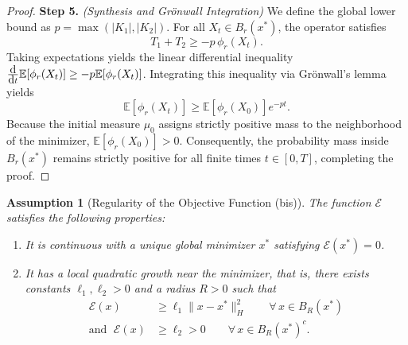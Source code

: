 \documentclass[12pt]{amsart}
\newcommand{\D}[1]{\mbox{\rm #1}}
\newcommand{\dd}{\D{d}}
\numberwithin{equation}{section}
\newtheorem{assumption}[theorem]{Assumption}
\begin{document}
\begin{proof}
\textbf{Step 5.} \textit{(Synthesis and Gr\"onwall Integration)} 
We define the global lower bound as $p = \max(|K_1|, |K_2|)$. For all $X_t \in B_r(x^*)$, the operator satisfies 
\begin{equation*}
    T_1 + T_2 \geq -p \, \phi_r(X_t).
\end{equation*}
Taking expectations yields the linear differential inequality $\frac{\dd}{\dd t} \mathbb{E}[\phi_r(X_t)] \geq -p \mathbb{E}[\phi_r(X_t)]$. Integrating this inequality via Gr\"onwall's lemma yields 
\begin{equation*}
    \mathbb{E}[\phi_r(X_t)] \geq \mathbb{E}[\phi_r(X_0)] e^{-pt}.
\end{equation*}
Because the initial measure $\mu_0$ assigns strictly positive mass to the neighborhood of the minimizer, $\mathbb{E}[\phi_r(X_0)] > 0$. Consequently, the probability mass inside $B_r(x^*)$ remains strictly positive for all finite times $t \in [0,T]$, completing the proof.
\end{proof}



\begin{assumption}[Regularity of the Objective Function (bis)]
\label{assum:objective bis}
The function $\mathscr{E}$ satisfies the following properties:
\begin{enumerate}
    \item It is continuous with a unique global minimizer $x^*$ satisfying $\mathscr{E}(x^*) = 0$.
    \item It has a local quadratic growth near the minimizer, that is, there exists constants $\ell_1,\ell_2 > 0$ and a radius $R > 0$ such that 
    \begin{equation*}
    \begin{aligned}
        \mathscr{E}(x) &\geq \ell_1 \|x - x^*\|_H^2 \qquad \forall\, x\in B_{R}(x^*)\\
        \text{and } \; \mathscr{E}(x) &\geq \ell_2>0 \qquad \forall\, x\in B_{R}(x^*)^c.
    \end{aligned}
    \end{equation*}
\end{enumerate}
\end{assumption}
\end{document}
